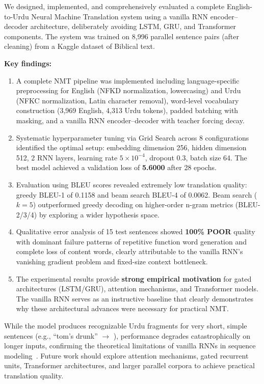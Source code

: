 \documentclass[runningheads]{llncs}
\begin{document}
We designed, implemented, and comprehensively evaluated a complete English-to-Urdu Neural Machine Translation system using a vanilla RNN encoder--decoder architecture, deliberately avoiding LSTM, GRU, and Transformer components. The system was trained on 8,996 parallel sentence pairs (after cleaning) from a Kaggle dataset of Biblical text.

\textbf{Key findings:}
\begin{enumerate}
    \item A complete NMT pipeline was implemented including language-specific preprocessing for English (NFKD normalization, lowercasing) and Urdu (NFKC normalization, Latin character removal), word-level vocabulary construction (3,969 English, 4,313 Urdu tokens), padded batching with masking, and a vanilla RNN encoder--decoder with teacher forcing decay.
    
    \item Systematic hyperparameter tuning via Grid Search across 8 configurations identified the optimal setup: embedding dimension 256, hidden dimension 512, 2 RNN layers, learning rate $5\times10^{-4}$, dropout 0.3, batch size 64. The best model achieved a validation loss of \textbf{5.6000} after 28 epochs.
    
    \item Evaluation using BLEU scores revealed extremely low translation quality: greedy BLEU-1 of 0.1158 and beam search BLEU-4 of 0.0062. Beam search ($k{=}5$) outperformed greedy decoding on higher-order n-gram metrics (BLEU-2/3/4) by exploring a wider hypothesis space.
    
    \item Qualitative error analysis of 15 test sentences showed \textbf{100\% POOR} quality with dominant failure patterns of repetitive function word generation and complete loss of content words, clearly attributable to the vanilla RNN's vanishing gradient problem and fixed-size context bottleneck.
    
    \item The experimental results provide \textbf{strong empirical motivation} for gated architectures (LSTM/GRU), attention mechanisms, and Transformer models. The vanilla RNN serves as an instructive baseline that clearly demonstrates why these architectural advances were necessary for practical NMT.
\end{enumerate}

While the model produces recognizable Urdu fragments for very short, simple sentences (e.g., ``tom's drunk'' $\to$ ), performance degrades catastrophically on longer inputs, confirming the theoretical limitations of vanilla RNNs in sequence modeling~\cite{bengio1994learning, cho2014properties}. Future work should explore attention mechanisms, gated recurrent units, Transformer architectures, and larger parallel corpora to achieve practical translation quality.
\end{document}
